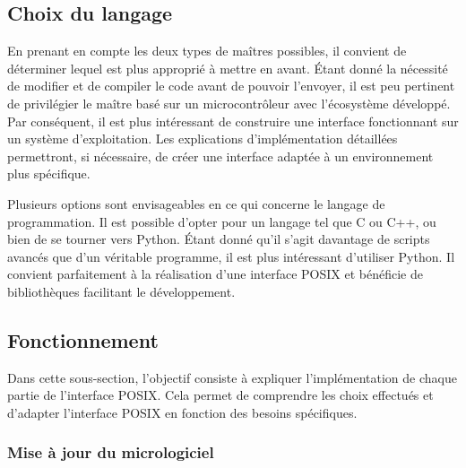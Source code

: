 \subsection{Choix du langage}

En prenant en compte les deux types de maîtres possibles, il convient de déterminer lequel est plus approprié à mettre en avant.
Étant donné la nécessité de modifier et de compiler le code avant de pouvoir l'envoyer, il est peu pertinent de privilégier le maître basé sur un microcontrôleur avec l'écosystème développé.
Par conséquent, il est plus intéressant de construire une interface fonctionnant sur un système d'exploitation. Les explications d'implémentation détaillées permettront, si nécessaire, de créer une interface adaptée à un environnement plus spécifique.

Plusieurs options sont envisageables en ce qui concerne le langage de programmation.
Il est possible d'opter pour un langage tel que C ou C++, ou bien de se tourner vers Python.
Étant donné qu'il s'agit davantage de scripts avancés que d'un véritable programme, il est plus intéressant d'utiliser Python.
Il convient parfaitement à la réalisation d'une interface POSIX et bénéficie de bibliothèques facilitant le développement.

\subsection{Fonctionnement}

Dans cette sous-section, l'objectif consiste à expliquer l'implémentation de chaque partie de l'interface POSIX.
Cela permet de comprendre les choix effectués et d'adapter l'interface POSIX en fonction des besoins spécifiques.

\subsubsection{Mise à jour du micrologiciel}

